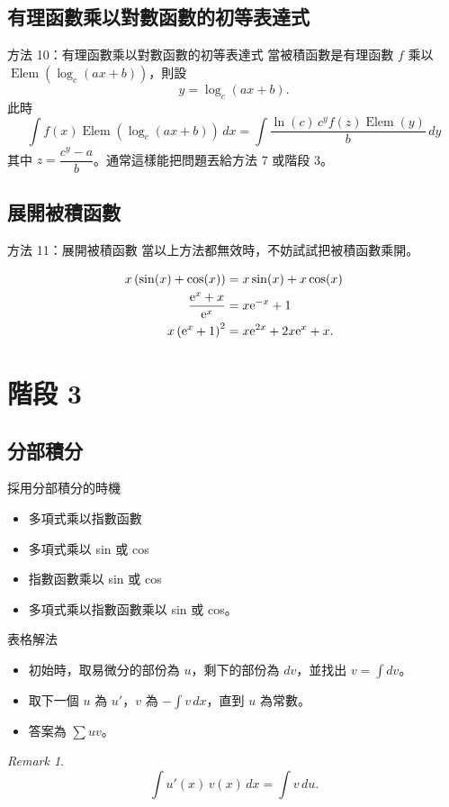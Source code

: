 \documentclass{beamer}
\newcommand{\e}{\textup e}
\newcommand{\Elem}{\operatorname{Elem}}
\theoremstyle{remark}
\newtheorem{remark}{Remark}
\begin{document}
\begin{CJK}{UTF8}{bsmi}
\subsection[對數替代]{有理函數乘以對數函數的初等表達式}
\begin{frame}{方法 10：有理函數乘以對數函數的初等表達式}
  當被積函數是有理函數 $f$ 乘以 $\Elem(\log_c(ax + b))$，則設
  \[y = \log_c(ax + b).\]
  此時
  \[\int f(x) \Elem(\log_c(ax + b))\,dx = \int \frac{\ln(c)\,c^y f(z) \Elem(y)}{b}\,dy\]
  其中 $z = \dfrac{c^y - a}{b}$。通常這樣能把問題丟給方法 7 或階段 3。
\end{frame}

\subsection{展開被積函數}
\begin{frame}{方法 11：展開被積函數}
  當以上方法都無效時，不妨試試把被積函數乘開。
  \begin{example}
    \begin{align*}
      x \left( \sin(x) + \cos(x) \right) &= x \sin(x) + x \cos(x)\\
      \frac{\e^x + x}{\e^x} &= x \e^{-x} + 1\\
      x \left( \e^x + 1 \right)^2 &= x \e^{2x} + 2x \e^x + x.
    \end{align*}
  \end{example}
\end{frame}

\section{階段 3}
\subsection{分部積分}
\begin{frame}{採用分部積分的時機}
  \begin{itemize}
    \item 多項式乘以指數函數
    \item 多項式乘以 sin 或 cos
    \item 指數函數乘以 sin 或 cos
    \item 多項式乘以指數函數乘以 sin 或 cos。
  \end{itemize}
\end{frame}

\begin{frame}{表格解法}
  \begin{theorem}
    \begin{itemize}
      \item 初始時，取易微分的部份為 $u$，剩下的部份為 $dv$，並找出 $v = \int dv$。
      \item 取下一個 $u$ 為 $u'$，$v$ 為 $-\int v\,dx$，直到 $u$ 為常數。
      \item 答案為 $\sum uv$。
    \end{itemize}
  \end{theorem}
  \begin{remark}
    \[\int u'(x)\,v(x)\,dx = \int v\,du.\]
  \end{remark}
\end{frame}


\end{CJK}
\end{document}
